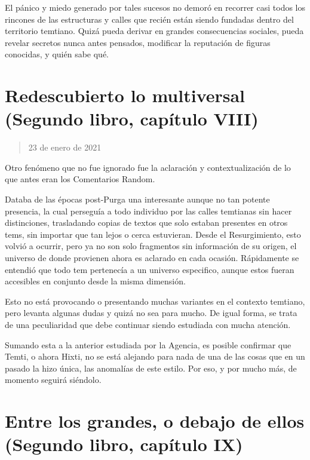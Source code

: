 \documentclass[
]{book}
\begin{document}
El pánico y miedo generado por tales sucesos no demoró en recorrer casi todos los rincones de las estructuras y calles que recién están siendo fundadas dentro del territorio temtiano. Quizá pueda derivar en grandes consecuencias sociales, pueda revelar secretos nunca antes pensados, modificar la reputación de figuras conocidas, y quién sabe qué.

\hypertarget{redescubierto-lo-multiversal-segundo-libro-capuxedtulo-viii}{%
\section{Redescubierto lo multiversal (Segundo libro, capítulo VIII)}\label{redescubierto-lo-multiversal-segundo-libro-capuxedtulo-viii}}

\begin{quote}
23 de enero de 2021
\end{quote}

Otro fenómeno que no fue ignorado fue la aclaración y contextualización de lo que antes eran los Comentarios Random.

Databa de las épocas post-Purga una interesante aunque no tan potente presencia, la cual perseguía a todo individuo por las calles temtianas sin hacer distinciones, trasladando copias de textos que solo estaban presentes en otros tems, sin importar que tan lejos o cerca estuvieran. Desde el Resurgimiento, esto volvió a ocurrir, pero ya no son solo fragmentos sin información de su origen, el universo de donde provienen ahora es aclarado en cada ocasión. Rápidamente se entendió que todo tem pertenecía a un universo especifico, aunque estos fueran accesibles en conjunto desde la misma dimensión.

Esto no está provocando o presentando muchas variantes en el contexto temtiano, pero levanta algunas dudas y quizá no sea para mucho. De igual forma, se trata de una peculiaridad que debe continuar siendo estudiada con mucha atención.

Sumando esta a la anterior estudiada por la Agencia, es posible confirmar que Temti, o ahora Hixti, no se está alejando para nada de una de las cosas que en un pasado la hizo única, las anomalías de este estilo. Por eso, y por mucho más, de momento seguirá siéndolo.

\hypertarget{entre-los-grandes-o-debajo-de-ellos-segundo-libro-capuxedtulo-ix}{%
\section{Entre los grandes, o debajo de ellos (Segundo libro, capítulo IX)}\label{entre-los-grandes-o-debajo-de-ellos-segundo-libro-capuxedtulo-ix}}
\end{document}
